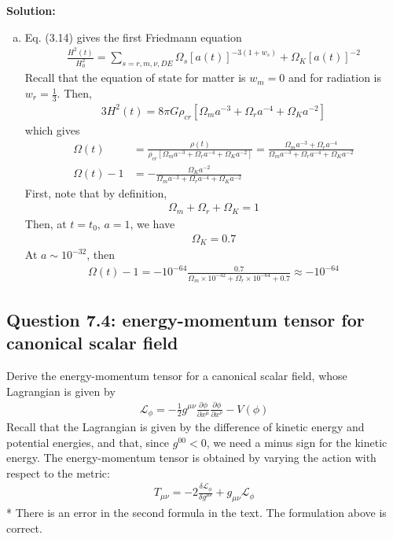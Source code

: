 \documentclass[11pt]{article}
\begin{document}
\textbf{Solution:}
\begin{enumerate} [(a)]
    \item Eq. (3.14) gives the first Friedmann equation 
    \begin{align*}
        \frac{H^2(t)}{H_0^2} = \sum_{s=r,m,\nu,DE} \Omega_s[a(t)]^{-3(1+w_s)} + \Omega_K[a(t)]^{-2}
    \end{align*}
    Recall that the equation of state for matter is $w_m = 0$ and for radiation is $w_r = \frac{1}{3}$. Then, 
    \begin{align*}
        3H^2(t) = 8\pi G \rho_{cr} \left[ \Omega_ma^{-3} + \Omega_r a^{-4} + \Omega_K a^{-2}\right] 
    \end{align*}
    which gives 
    \begin{align*}
        \Omega(t) &= \frac{\rho(t)}{\rho_{cr} [\Omega_m a^{-3} + \Omega_ra^{-4} + \Omega_Ka^{-2}]} = \frac{\Omega_ma^{-3} + \Omega_ra^{-4}}{\Omega_m a^{-3} + \Omega_r a^{-4} + \Omega_K a^{-2}} \\
        \Omega(t) -1 &= - \frac{\Omega_Ka^{-2}}{\Omega_m a^{-3} + \Omega_r a^{-4} +\Omega_K a^{-2}}
    \end{align*}
    First, note that by definition, 
    \begin{align*}
        \Omega_m + \Omega_r + \Omega_K = 1 
    \end{align*}
    Then, at $t = t_0$, $a = 1$, we have 
    \begin{align*}
        \Omega_K = 0.7
    \end{align*}
    At $a \sim 10^{-32}$, then 
    \begin{align*}
        \Omega(t) - 1 = - 10^{-64}\frac{0.7}{\Omega_m \times 10^{-32} + \Omega_r \times 10^{-64} + 0.7} \approx -10^{-64}
    \end{align*}
    
\end{enumerate}

\subsection{Question 7.4: energy-momentum tensor for canonical scalar field}
Derive the energy-momentum tensor for a canonical scalar field, whose Lagrangian is given by
\begin{align*}
    \mathcal{L}_\phi = - \frac{1}{2}g^{\mu\nu} \frac{\partial \phi}{\partial x^\mu} \frac{\partial \phi}{\partial x^\nu} - V(\phi)
\end{align*}
Recall that the Lagrangian is given by the difference of kinetic energy and potential energies, and that, since $g^{00} < 0$, we need a minus sign for the kinetic energy. The energy-momentum tensor is obtained by varying the action with respect to the metric: 
\begin{align*}
    T_{\mu\nu} = -2\frac{\delta \mathcal{L}_\phi}{\delta g^{\mu\nu}} + g_{\mu\nu} \mathcal{L}_\phi 
\end{align*}
* There is an error in the second formula in the text. The formulation above is correct. 
\end{document}
